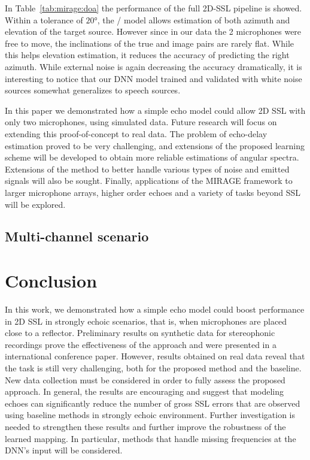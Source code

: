 \mynewline
In Table~\cref{tab:mirage:doa} the performance of the full 2D-SSL pipeline is showed.
Within a tolerance of $\ang{20}$, the \MIRAGE/ model allows estimation of both azimuth and elevation of the target source.
However since in our data the 2 microphones were free to move, the inclinations of the true and image pairs are rarely flat.
While this helps elevation estimation, it reduces the accuracy of predicting the right azimuth.
While external noise is again decreasing the accuracy dramatically,
it is interesting to notice that our \ac{DNN} model trained and validated with white noise sources somewhat generalizes to speech sources.

\mynewline
In this paper we demonstrated how a simple echo model could allow 2D SSL with only two microphones, using simulated data.
Future research will focus on extending this proof-of-concept to real data.
The problem of echo-delay estimation proved to be very challenging, and extensions of the proposed learning scheme will be developed to obtain more reliable estimations of angular spectra.
Extensions of the method to better handle various types of noise and emitted signals will also be sought.
Finally, applications of the MIRAGE framework to larger microphone arrays, higher order echoes and a variety of tasks beyond SSL will be explored.


\subsection{Multi-channel scenario}



\section{Conclusion}
In this work, we demonstrated how a simple echo model could boost performance in 2D \ac{SSL} in strongly echoic scenarios, that is, when microphones are placed close to a reflector.
Preliminary results on synthetic data for stereophonic recordings prove the effectiveness of the approach and were presented in a international conference paper.
However, results obtained on real data reveal that the task is still very challenging, both for the proposed method and the baseline.
New data collection must be considered in order to fully assess the proposed approach.
In general, the results are encouraging and suggest that modeling echoes can significantly reduce the number of gross \ac{SSL} errors that are observed using baseline methods in strongly echoic environment.
Further investigation is needed to strengthen these results and further improve the robustness of the learned mapping.
In particular, methods that handle missing frequencies at the \ac{DNN}'s input will be considered.

